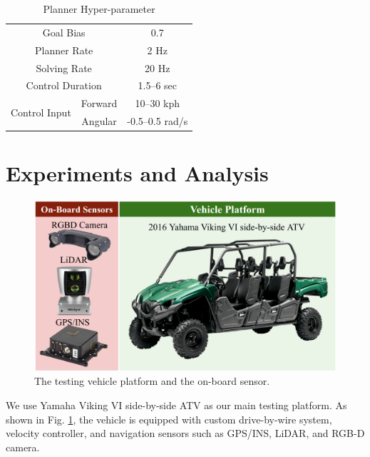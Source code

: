 \documentclass[../thesis.tex]{subfiles}
\begin{document}
\begin{table}[t]
	\centering
	\caption{Planner Hyper-parameter}
	\label{table:rrt-parameters}
	\begin{small}
	\begin{sc}
	\begin{tabular}{ccc}
		\midrule \midrule
		\multicolumn{2}{c}{Goal Bias} & 0.7 \\
		\multicolumn{2}{c}{Planner Rate} & 2 Hz \\
		\multicolumn{2}{c}{Solving Rate} & 20 Hz \\
		\multicolumn{2}{c}{Control Duration} & 1.5--6 sec \\
		\multirow{2}{*}{Control Input} & Forward & 10--30 kph \\
		 								& Angular & -0.5--0.5 rad/s \\ 
		\toprule
	\end{tabular}
	\end{sc}
	\end{small}
\end{table}


\section{Experiments and Analysis} \label{sec:rrt-experiments}


\begin{figure}[t]
	\begin{center}
		\centerline{\includegraphics[width=0.7\columnwidth]{./RRTPlanner/fig/viking.png}}
		\caption{The testing vehicle platform and the on-board sensor.}
		\label{fig:viking}
	\end{center}
\end{figure} 

We use Yamaha Viking VI side-by-side ATV as our main testing platform. As shown in Fig. \ref{fig:viking}, the vehicle is equipped with custom drive-by-wire system, velocity controller, and navigation sensors such as GPS/INS, LiDAR, and RGB-D camera. 
\end{document}
